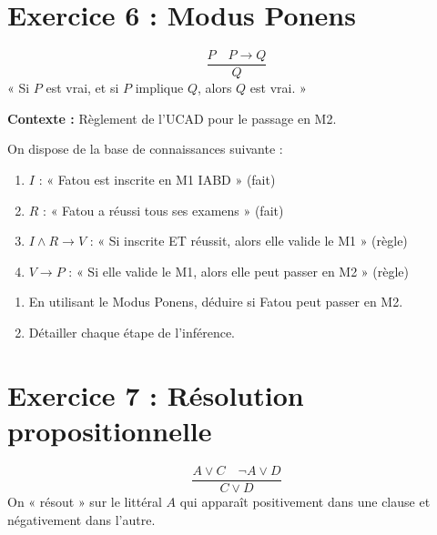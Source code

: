\documentclass[11pt,a4paper]{article}
\begin{document}
\section*{Exercice 6 : Modus Ponens}

\begin{rappelbox}
$$\frac{P \quad P \rightarrow Q}{Q}$$
« Si $P$ est vrai, et si $P$ implique $Q$, alors $Q$ est vrai. »
\end{rappelbox}

\begin{exercice}
\textbf{Contexte :} Règlement de l'UCAD pour le passage en M2.

On dispose de la base de connaissances suivante :
\begin{enumerate}
    \item $I$ : « Fatou est inscrite en M1 IABD » (fait)
    \item $R$ : « Fatou a réussi tous ses examens » (fait)
    \item $I \land R \rightarrow V$ : « Si inscrite ET réussit, alors elle valide le M1 » (règle)
    \item $V \rightarrow P$ : « Si elle valide le M1, alors elle peut passer en M2 » (règle)
\end{enumerate}

\begin{enumerate}[label=\alph*)]
    \item En utilisant le Modus Ponens, déduire si Fatou peut passer en M2.
    \item Détailler chaque étape de l'inférence.
\end{enumerate}
\end{exercice}

\section*{Exercice 7 : Résolution propositionnelle}

\begin{rappelbox}
$$\frac{A \lor C \quad \neg A \lor D}{C \lor D}$$
On « résout » sur le littéral $A$ qui apparaît positivement dans une clause et négativement dans l'autre.
\end{rappelbox}
\end{document}
